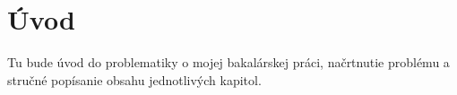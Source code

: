 \chapter*{Úvod} %

Tu bude úvod do problematiky o mojej bakalárskej práci, načrtnutie problému a stručné popísanie obsahu jednotlivých kapitol.
